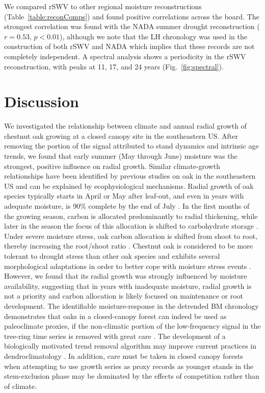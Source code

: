 We compared rSWV to other regional moisture reconstructions (Table~\ref{table:reconComps})
and found positive correlations across the board. The strongest
correlation was found with the NADA summer drought reconstruction
($r=0.53$, $p<0.01$), although we note that the LH chronology was used
in the construction of both rSWV and NADA which implies that these
records are not completely independent. A spectral analysis shows a
periodicity in the rSWV reconstruction, with peaks at 11, 17, and 24 years
(Fig.~\ref{fig:spectral}).


\section{Discussion}

We investigated the relationship between climate and annual radial growth
of chestnut oak growing at a closed canopy site in the southeastern
US. After removing the portion of the signal attributed to stand dynamics
and intrinsic age trends, we found that early summer (May through June)
moisture was the strongest, positive influence on radial growth. Similar
climate-growth relationships have been identified by previous studies on
oak in the southeastern US \cite{speer2009climate, li2011dendroclimatic}
and can be explained by ecophysiological mechanisms. 
 Radial growth of oak species typically starts in April or
May after leaf-out, and even in years with adequate moisture, is 90\%
complete by the end of July \cite{robertson1992factors}. In the first
months of the growing season, carbon is allocated predominantly to radial
thickening, while later in the season the focus of this allocation is
shifted to carbohydrate storage \cite{zweifel2006intra}. Under severe
moisture stress, oak carbon allocation is shifted from shoot to root,
thereby increasing the root/shoot ratio \cite{dickson1996oak}. Chestnut
oak is considered to be more tolerant to drought stress than other oak
species and exhibits several morphological adaptations in order to better
cope with moisture stress events \cite{dickson1996oak}. However, we found
that its radial growth was strongly influenced by moisture availability,
suggesting that in years with inadequate moisture, radial growth is not
a priority and carbon allocation is likely focused on maintenance or
root development. The identifiable moisture-response in the detrended
BM chronology demonstrates that oaks in a closed-canopy forest can
indeed be used as paleoclimate proxies, if the non-climatic portion
of the low-frequency signal in the tree-ring time series is removed
with great care \cite{cook1985time, cook1990tree}. The development of
a biologically motivated trend removal algorithm may improve current
practices in dendroclimatology \cite{melvin2008signal}. In addition,
care must be taken in closed canopy forests when attempting to use
growth series as proxy records as younger stands in the stem-exclusion
phase may be dominated by the effects of competition rather than of
climate\cite{oliver1980forest}.

